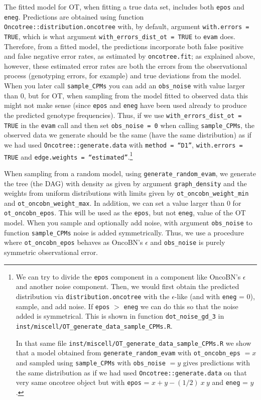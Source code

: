 \documentclass[a4paper,11pt]{article}
\begin{document}
The fitted model for OT, when fitting a true data set, includes both \texttt{epos} and \texttt{eneg}. Predictions are obtained using function \texttt{Oncotree::distribution.oncotree} with, by default, argument \texttt{with.errors = TRUE}, which is what argument \texttt{with\_errors\_dist\_ot = TRUE} to \texttt{evam} does. Therefore, from a fitted model, the predictions incorporate both false positive and false negative error rates, as estimated by \texttt{oncotree.fit}; as explained above, however, these estimated error rates are both the errors from the observational process (genotyping errors, for example) and true deviations from the model. When you later call \texttt{sample\_CPMs} you can add an \texttt{obs\_noise} with value larger than 0, but for OT, when sampling from the model fitted to observed data this might not make sense (since \texttt{epos} and \texttt{eneg} have been used already to produce the predicted genotype frequencies). Thus, if we use \texttt{with\_errors\_dist\_ot = TRUE} in the \texttt{evam} call and then set \texttt{obs\_noise = 0} when calling \texttt{sample\_CPMs}, the observed data we generate should be the same (have the same distribution) as if we had used \texttt{Oncotree::generate.data} with \texttt{method = ``D1''}, \texttt{with.errors = TRUE} and \texttt{edge.weights = ``estimated''}.\footnote{
  We can try to divide the \texttt{epos} component in a component like OncoBN's $\epsilon$ and another noise component. Then, we would first obtain the predicted distribution via \texttt{distribution.oncotree} with the $\epsilon$-like (and with \texttt{eneg} = 0), sample, and add noise. If \texttt{epos} $>$ \texttt{eneg} we can do this so that the noise added is symmetrical. This is shown in function \texttt{dot\_noise\_gd\_3} in \texttt{inst/miscell/OT\_generate\_data\_sample\_CPMs.R}.

  
In that same file \texttt{inst/miscell/OT\_generate\_data\_sample\_CPMs.R} we show that a model obtained from \texttt{generate\_random\_evam} with \texttt{ot\_oncobn\_eps}  $= x$ and sampled using \texttt{sample\_CPMs} with \texttt{obs\_noise} $= y$ gives predictions with the same distribution as if we had used \texttt{Oncotree::generate.data} on that very same oncotree object but with \texttt{epos} = $x + y - (1/2)\ x\ y$ and \texttt{eneg} = $y$.}



When sampling from a random model, using \texttt{generate\_random\_evam}, we generate the tree (the DAG) with density as given by argument \texttt{graph\_density} and the weights from uniform distributions with limits  given by \texttt{ot\_oncobn\_weight\_min} and \texttt{ot\_oncobn\_weight\_max}. In addition, we can set a value larger than 0 for \texttt{ot\_oncobn\_epos}. This will be used as the \texttt{epos}, but not \texttt{eneg}, value of the OT model. When you sample and optionally add noise, with argument \texttt{obs\_noise} to function \texttt{sample\_CPMs} noise is added symmetrically. Thus, we use a procedure where \texttt{ot\_oncobn\_epos} behaves as OncoBN's $\epsilon$ and \texttt{obs\_noise} is purely symmetric observational error.
\end{document}
